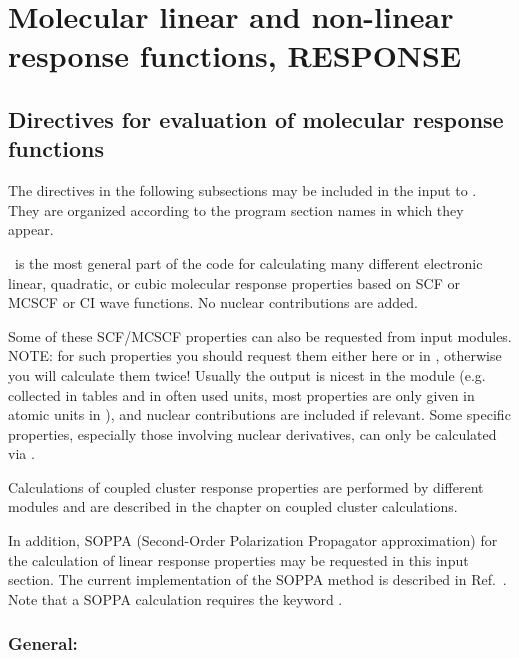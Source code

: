 \chapter{Molecular linear and non-linear response functions, RESPONSE}
\label{ch:response}

\section{Directives for evaluation of molecular response functions}\label{sec:rspinp}

The directives in the following subsections may be included in the input to \resp.
They are organized according to the program section names in which they
appear.

\resp\ is the most general part of the code for calculating 
many different electronic linear, quadratic, or cubic molecular
response properties based on SCF or MCSCF or CI wave functions.
No nuclear contributions are added.

Some of these SCF/MCSCF properties can also be requested
from  input modules.
NOTE: for such properties you should request them either here or
in , otherwise you will calculate them twice!
Usually the output is nicest in
the  module (e.g. collected in tables and in
often used units, most properties are only given in atomic
units in \resp), and nuclear contributions are included if relevant.
Some specific properties, especially those involving nuclear derivatives,
can only be calculated via .

Calculations of coupled cluster response properties are performed
by different modules and are described
in the chapter on coupled cluster calculations.

In addition, SOPPA
(Second-Order Polarization Propagator 
approximation) for the calculation of linear response
properties may be requested in this input section. The current
implementation of the SOPPA method is described 
in Ref.~\cite{mjpekdtehjajjojcp}. Note that a SOPPA calculation
requires the keyword .


\subsection{General: }

